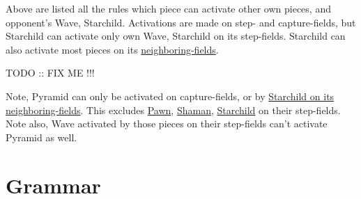 
Above are listed all the rules which piece can activate other own pieces, and
opponent's Wave, Starchild. Activations are made on step- and capture-fields,
but Starchild can activate only own Wave, Starchild on its step-fields. Starchild
can also activate most pieces on its
\hyperref[fig:scn_o_06_starchild_activating_on_neighboring_fields]{neighboring-fields}.

\huge
TODO :: FIX ME !!!
\normalsize

Note, Pyramid can only be activated on capture-fields, or by
\hyperref[fig:scn_o_06_starchild_activating_on_neighboring_fields]{Starchild on its neighboring-fields}.
This excludes
\hyperref[fig:scn_ma_04_pyramid_activation_by_pawn]{Pawn},
\hyperref[fig:scn_cot_02_light_shaman_step_ply]{Shaman},
\hyperref[fig:scn_o_02_starchild_activating_own_piece_init]{Starchild}
on their step-fields. Note also,
Wave activated by those pieces on their step-fields %
can't activate Pyramid as well.

\clearpage %

\section*{Grammar}
\label{sec:Appendix/Grammar}

